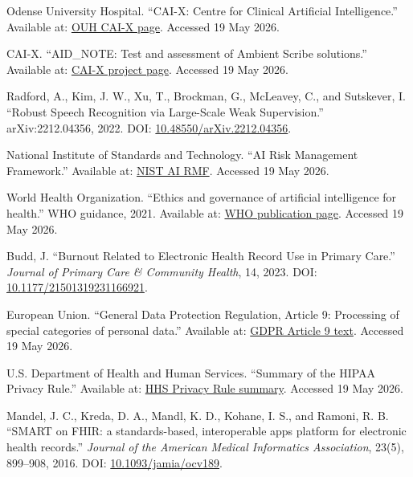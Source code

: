 \begin{enumerate}[label={\textbf{[\arabic*]}},leftmargin=2.4em]
  \item \hypertarget{ref:8}{}Odense University Hospital. ``CAI-X: Centre for Clinical Artificial Intelligence.'' Available at: \href{https://en.ouh.dk/research-and-innovation/innovation-and-health-technologies/cai-x}{OUH CAI-X page}. Accessed 19 May 2026.
  \item \hypertarget{ref:9}{}CAI-X. ``AID\_NOTE: Test and assessment of Ambient Scribe solutions.'' Available at: \href{https://cai-x.com/projects/current-projects/aid_note-test-and-assessment-of-ambient-scribe-solutions}{CAI-X project page}. Accessed 19 May 2026.
  \item \hypertarget{ref:10}{}Radford, A., Kim, J. W., Xu, T., Brockman, G., McLeavey, C., and Sutskever, I. ``Robust Speech Recognition via Large-Scale Weak Supervision.'' arXiv:2212.04356, 2022. DOI: \href{https://doi.org/10.48550/arXiv.2212.04356}{10.48550/arXiv.2212.04356}.
  \item \hypertarget{ref:11}{}National Institute of Standards and Technology. ``AI Risk Management Framework.'' Available at: \href{https://www.nist.gov/itl/ai-risk-management-framework}{NIST AI RMF}. Accessed 19 May 2026.
  \item \hypertarget{ref:12}{}World Health Organization. ``Ethics and governance of artificial intelligence for health.'' WHO guidance, 2021. Available at: \href{https://www.who.int/publications/i/item/9789240029200}{WHO publication page}. Accessed 19 May 2026.
  \item \hypertarget{ref:13}{}Budd, J. ``Burnout Related to Electronic Health Record Use in Primary Care.'' \textit{Journal of Primary Care \& Community Health}, 14, 2023. DOI: \href{https://doi.org/10.1177/21501319231166921}{10.1177/21501319231166921}.
  \item \hypertarget{ref:14}{}European Union. ``General Data Protection Regulation, Article 9: Processing of special categories of personal data.'' Available at: \href{https://gdpr-info.eu/art-9-gdpr/}{GDPR Article 9 text}. Accessed 19 May 2026.
  \item \hypertarget{ref:15}{}U.S. Department of Health and Human Services. ``Summary of the HIPAA Privacy Rule.'' Available at: \href{https://www.hhs.gov/hipaa/for-professionals/privacy/laws-regulations/index.html}{HHS Privacy Rule summary}. Accessed 19 May 2026.
  \item \hypertarget{ref:16}{}Mandel, J. C., Kreda, D. A., Mandl, K. D., Kohane, I. S., and Ramoni, R. B. ``SMART on FHIR: a standards-based, interoperable apps platform for electronic health records.'' \textit{Journal of the American Medical Informatics Association}, 23(5), 899--908, 2016. DOI: \href{https://doi.org/10.1093/jamia/ocv189}{10.1093/jamia/ocv189}.

\end{enumerate}
